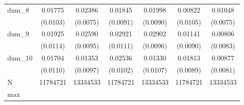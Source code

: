 {\begin{tabular}{l*{6}{c}}
dum\_8       &     0.01775\sym{*}  &     0.02386\sym{***}&     0.01845\sym{**} &     0.01998\sym{**} &     0.00822         &     0.01048         \\
            &    (0.0103)         &    (0.0075)         &    (0.0091)         &    (0.0090)         &    (0.0105)         &    (0.0075)         \\
dum\_9       &     0.01925\sym{*}  &     0.02590\sym{***}&     0.02921\sym{**} &     0.02902\sym{***}&     0.01141         &     0.00806         \\
            &    (0.0114)         &    (0.0095)         &    (0.0111)         &    (0.0096)         &    (0.0090)         &    (0.0083)         \\
dum\_10      &     0.01704         &     0.01353         &     0.02536\sym{**} &     0.01330         &     0.01813\sym{**} &     0.00877         \\
            &    (0.0110)         &    (0.0097)         &    (0.0102)         &    (0.0107)         &    (0.0089)         &    (0.0081)         \\
\midrule
N           &    11784721         &    13334533         &    11784721         &    13334533         &    11784721         &    13334533         \\
max         &                     &                     &                     &                     &                     &                     \\
\bottomrule
\end{tabular}
}
